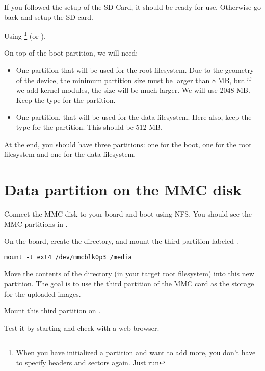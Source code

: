 If you followed the setup of the SD-Card, it should be ready for use.
Otherwise go back and setup the SD-card.

Using 
\footnote{When you have initialized a partition and want to add more, you don't have to specify headers and sectors again. Just run } (or ).

\clearpage
On top of the boot partition, we will need:

\begin{itemize}

\item One partition that will be used for the root filesystem. 
  Due to the geometry of the device, the minimum partition size must be larger than 8 MB,
  but  if we add kernel modules, the size will be much larger.
  We will use 2048 MB.
  Keep the  type for the partition.

\item One partition, that will be used for the data filesystem. 
  Here also, keep the  type for the partition.
  This should be 512 MB.

\end{itemize}

At the end, you should have three partitions: one for the boot, one
for the root filesystem and one for the data filesystem.

\section{Data partition on the MMC disk}

Connect the MMC disk to your board and boot using NFS. 
You should see the MMC partitions in .

On the board, create the  directory, and mount the third partition
labeled .

\begin{verbatim}
mount -t ext4 /dev/mmcblk0p3 /media
\end{verbatim}

Move the contents of the  directory (in your target root filesystem)
into this new partition. The goal is to use the third partition of the
MMC card as the storage for the uploaded images.

Mount this third partition on .

Test it by starting  and check with a web-browser.


